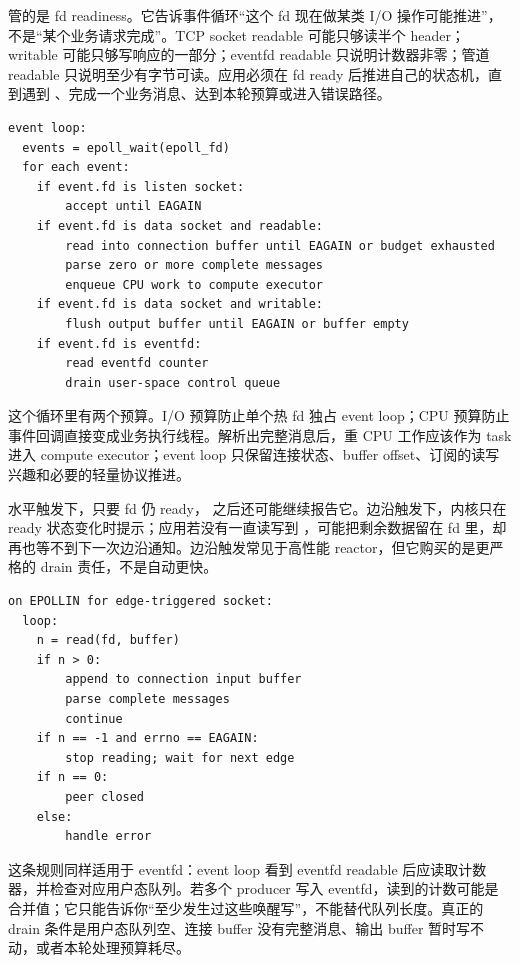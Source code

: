  管的是 fd readiness。它告诉事件循环“这个 fd 现在做某类 I/O 操作可能推进”，不是“某个业务请求完成”。TCP socket readable 可能只够读半个 header；writable 可能只够写响应的一部分；eventfd readable 只说明计数器非零；管道 readable 只说明至少有字节可读。应用必须在 fd ready 后推进自己的状态机，直到遇到 、完成一个业务消息、达到本轮预算或进入错误路径。

\begin{lstlisting}[numbers=none,caption={epoll reactor 的基本状态循环}]
event loop:
  events = epoll_wait(epoll_fd)
  for each event:
    if event.fd is listen socket:
        accept until EAGAIN
    if event.fd is data socket and readable:
        read into connection buffer until EAGAIN or budget exhausted
        parse zero or more complete messages
        enqueue CPU work to compute executor
    if event.fd is data socket and writable:
        flush output buffer until EAGAIN or buffer empty
    if event.fd is eventfd:
        read eventfd counter
        drain user-space control queue
\end{lstlisting}

这个循环里有两个预算。I/O 预算防止单个热 fd 独占 event loop；CPU 预算防止事件回调直接变成业务执行线程。解析出完整消息后，重 CPU 工作应该作为 task 进入 compute executor；event loop 只保留连接状态、buffer offset、订阅的读写兴趣和必要的轻量协议推进。

水平触发下，只要 fd 仍 ready， 之后还可能继续报告它。边沿触发下，内核只在 ready 状态变化时提示；应用若没有一直读写到 ，可能把剩余数据留在 fd 里，却再也等不到下一次边沿通知。边沿触发常见于高性能 reactor，但它购买的是更严格的 drain 责任，不是自动更快。

\begin{lstlisting}[numbers=none,caption={边沿触发必须 drain 到 EAGAIN}]
on EPOLLIN for edge-triggered socket:
  loop:
    n = read(fd, buffer)
    if n > 0:
        append to connection input buffer
        parse complete messages
        continue
    if n == -1 and errno == EAGAIN:
        stop reading; wait for next edge
    if n == 0:
        peer closed
    else:
        handle error
\end{lstlisting}

这条规则同样适用于 eventfd：event loop 看到 eventfd readable 后应读取计数器，并检查对应用户态队列。若多个 producer 写入 eventfd，读到的计数可能是合并值；它只能告诉你“至少发生过这些唤醒写”，不能替代队列长度。真正的 drain 条件是用户态队列空、连接 buffer 没有完整消息、输出 buffer 暂时写不动，或者本轮处理预算耗尽。

